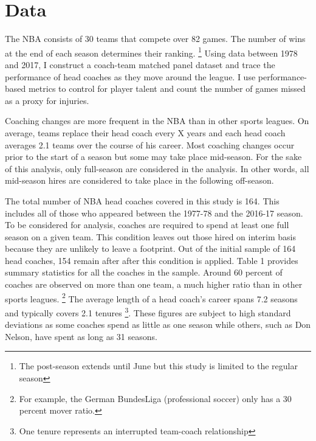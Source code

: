 \section{Data}

The NBA consists of 30 teams that compete over 82 games. The number of wins at the end of each season determines their ranking. \footnote{The post-season extends until June but this study is limited to the regular season} Using data between 1978 and 2017, I construct a coach-team matched panel dataset and trace the performance of head coaches as they move around the league. I use performance-based metrics to control for player talent and count the number of games missed as a proxy for injuries.

Coaching changes are more frequent in the NBA than in other sports leagues. On average, teams replace their head coach every X years and each head coach averages 2.1 teams over the course of his career. Most coaching changes occur prior to the start of a season but some may take place mid-season. For the sake of this analysis, only full-season are considered in the analysis. In other words, all mid-season hires are considered to take place in the following off-season. 

The total number of NBA head coaches covered in this study is 164. This includes all of those who appeared between the 1977-78 and the 2016-17 season. To be considered for analysis, coaches are required to spend at least one full season on a given team. This condition leaves out those hired on interim basis because they are unlikely to leave a footprint. Out of the initial sample of 164 head coaches, 154 remain after after this condition is applied. Table 1 provides summary statistics for all the coaches in the sample. Around 60 percent of coaches are observed on more than one team, a much higher ratio than in other sports leagues. \footnote{For example, the German BundesLiga (professional soccer) only has a 30 percent mover ratio.} The average length of a head coach's career spans 7.2 seasons and typically covers 2.1 tenures \footnote{One tenure represents an interrupted team-coach relationship}. These figures are subject to high standard deviations as some coaches spend as little as one season while others, such as Don Nelson, have spent as long as 31 seasons.